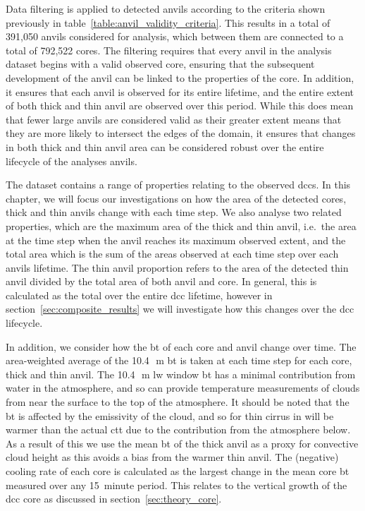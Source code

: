 Data filtering is applied to detected anvils according to the criteria shown previously in table~\ref{table:anvil_validity_criteria}.
This results in a total of 391,050 anvils considered for analysis, which between them are connected to a total of 792,522 cores.
The filtering requires that every anvil in the analysis dataset begins with a valid observed core, ensuring that the subsequent development of the anvil can be linked to the properties of the core.
In addition, it ensures that each anvil is observed for its entire lifetime, and the entire extent of both thick and thin anvil are observed over this period.
While this does mean that fewer large anvils are considered valid as their greater extent means that they are more likely to intersect the edges of the domain, it ensures that changes in both thick and thin anvil area can be considered robust over the entire lifecycle of the analyses anvils.

The dataset contains a range of properties relating to the observed \acrshort{dcc}s.
In this chapter, we will focus our investigations on how the area of the detected cores, thick and thin anvils change with each time step.
We also analyse two related properties, which are the maximum area of the thick and thin anvil, i.e.\ the area at the time step when the anvil reaches its maximum observed extent, and the total area which is the sum of the areas observed at each time step over each anvils lifetime.
The thin anvil proportion refers to the area of the detected thin anvil divided by the total area of both anvil and core.
In general, this is calculated as the total over the entire \acrshort{dcc} lifetime, however in section~\ref{sec:composite_results} we will investigate how this changes over the \acrshort{dcc} lifecycle.

In addition, we consider how the \acrshort{bt} of each core and anvil change over time.
The area-weighted average of the 10.4\,\unit{\mu m} \acrshort{bt} is taken at each time step for each core, thick and thin anvil.
The 10.4\,\unit{\mu m} \acrshort{lw} window \acrshort{bt} has a minimal contribution from water in the atmosphere, and so can provide temperature measurements of clouds from near the surface to the top of the atmosphere.
It should be noted that the \acrshort{bt} is affected by the emissivity of the cloud, and so for thin cirrus in will be warmer than the actual \acrshort{ctt} due to the contribution from the atmosphere below.
As a result of this we use the mean \acrshort{bt} of the thick anvil as a proxy for convective cloud height as this avoids a bias from the warmer thin anvil.
The (negative) cooling rate of each core is calculated as the largest change in the mean core \acrshort{bt} measured over any 15~minute period.
This relates to the vertical growth of the \acrshort{dcc} core as discussed in section~\ref{sec:theory_core}.

